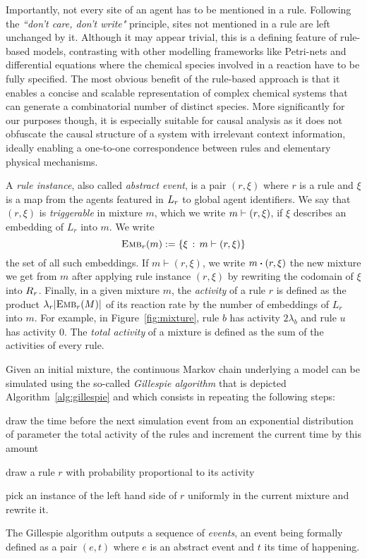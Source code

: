 

Importantly, not every site of an agent has to be mentioned in a rule.
Following the \textit{``don't care, don't write"} principle, sites not
mentioned in a rule are left unchanged by it. Although it may appear
trivial, this is a defining feature of rule-based models, contrasting
with other modelling frameworks %
like Petri-nets and differential equations where the chemical species
involved in a reaction have to be fully specified. The most obvious
benefit of the rule-based approach is that it enables a concise and
scalable representation of complex chemical systems that can generate
a combinatorial number of distinct species. More significantly for our
purposes though, it is especially suitable for causal analysis as it
does not obfuscate the causal structure of a system with irrelevant
context information, ideally enabling a one-to-one correspondence
between rules and elementary physical mechanisms.

A \emph{rule instance}, also called \emph{abstract event}, is a pair
$(r, \xi)$ where $r$ is a rule and $\xi$ is a map from the agents
featured in $L_{r}$ to global agent identifiers.  We say
that $(r, \xi)$ is \emph{triggerable} in mixture $m$, which we write
$m \vdash (r, \xi)$, if $\xi$ describes an embedding of $L_r$ into $m$. 
We write
\[{\textsc{Emb}}_{r}(m) := \{ \xi \,:\, m \vdash (r, \xi)\}\] the set
of all such embeddings. If $m \vdash (r, \xi)$, we write $\UPDATE{m}{(r, \xi)}$
the new mixture we get from $m$ after applying rule instance $(r, \xi)$
by rewriting the codomain of $\xi$ into $R_{r}$.
Finally, in a given mixture $m$, the \emph{activity} of a rule
$r$ is defined as the product $\lambda_r|{\textsc{Emb}}_{r}(M)|$ of its reaction rate 
by the number of embeddings of $L_r$ into $m$. For example, 
in Figure~\ref{fig:mixture}, rule $b$ has activity $2\lambda_b$ and rule
$u$ has activity $0$. The \emph{total activity} of a mixture is defined
as the sum of the activities of every rule.

Given an initial mixture, the continuous Markov chain underlying
a model can be simulated using the so-called \emph{Gillespie algorithm}
that is depicted Algorithm~\ref{alg:gillespie} and which consists
in repeating the following steps:
\begin{inparaenum}[1)]
\item draw the time before the next simulation event from an
  exponential distribution of parameter the total activity of
  the rules and increment the current time by this amount
\item draw a rule $r$ with probability proportional to its activity
\item pick an instance of the left hand side of $r$ uniformly in the
  current mixture and rewrite it.
\end{inparaenum}
The Gillespie algorithm outputs a sequence of \emph{events}, an event
being formally defined as a pair $(e, t)$ where $e$ is an abstract event
and $t$ its time of happening.


